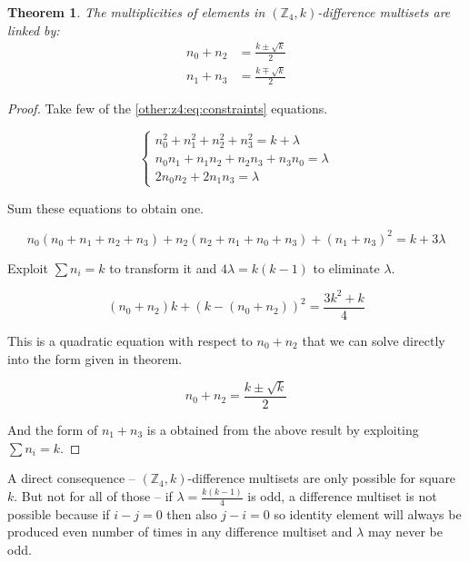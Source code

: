 \documentclass{article}
\theoremstyle{plain}
\newtheorem{theorem}{Theorem}[section]
\theoremstyle{definition}
\theoremstyle{remark}
\begin{document}
			\begin{theorem}
				The multiplicities of elements in $(\mathbb Z_4, k)$-difference multisets are linked by:
				\begin{equation}
					\begin{split}
						n_0 + n_2 &= \frac{k \pm \sqrt k}{2} \\
						n_1 + n_3 &= \frac{k \mp \sqrt k}{2}
					\end{split}
				\end{equation}
			\end{theorem}
			
			\begin{proof}
				Take few of the \eqref{other:z4:eq:constraints} equations.
				
				\begin{equation}
					\begin{cases}
						n_0^2 + n_1^2 + n_2^2 + n_3^2 = k + \lambda \\
						n_0 n_1 + n_1 n_2 + n_2 n_3 + n_3 n_0 = \lambda \\
						2 n_0 n_2 + 2 n_1 n_3 = \lambda
					\end{cases}
				\end{equation}
				
				Sum these equations to obtain one.
				
				\begin{equation}
					n_0 (n_0+n_1+n_2+n_3) + n_2 (n_2 + n_1 + n_0 + n_3) + (n_1 + n_3)^2 = k + 3 \lambda
				\end{equation}
				
				Exploit $\sum n_i = k$ to transform it and $4\lambda = k(k-1)$ to eliminate $\lambda$.
				
				\begin{equation}
					(n_0 + n_2)k + (k-(n_0 + n_2))^2 = \frac{3k^2 + k}{4}
				\end{equation}
				
				This is a quadratic equation with respect to $n_0+n_2$ that we can solve directly into the form given in theorem.
				
				\begin{equation}
					n_0 + n_2 = \frac{k \pm \sqrt k}{2}
				\end{equation}
				
				And the form of $n_1+n_3$ is a obtained from the above result by exploiting $\sum n_i = k$.
			\end{proof}
			
			A direct consequence -- $(\mathbb Z_4, k)$-difference multisets are only possible for square $k$. But not for all of those -- if $\lambda=\frac{k(k-1)}4$ is odd, a difference multiset is not possible because if $i-j=0$ then also $j-i=0$ so identity element will always be produced even number of times in any difference multiset and $\lambda$ may never be odd.
			
\end{document}
